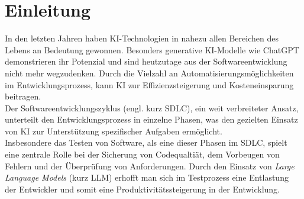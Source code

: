
\chapter{Einleitung}
In den letzten Jahren haben \acs{KI}-Technologien in nahezu allen Bereichen des Lebens an Bedeutung gewonnen. Besonders generative KI-Modelle wie ChatGPT demonstrieren ihr Potenzial und sind heutzutage aus der Softwareentwicklung nicht mehr wegzudenken. \cite{hammermann_ki_nodate} Durch die Vielzahl an Automatisierungsmöglichkeiten im Entwicklungsprozess, kann KI zur Effizienzsteigerung und Kosteneinsparung beitragen.\\ Der Softwareentwicklungszyklus (engl. kurz \acs{SDLC}), ein weit verbreiteter Ansatz, unterteilt den Entwicklungsprozess in einzelne Phasen, was den gezielten Einsatz von KI zur Unterstützung spezifischer Aufgaben ermöglicht.\\ Insbesondere das Testen von Software, als eine dieser Phasen im SDLC, spielt eine zentrale Rolle bei der Sicherung von Codequaltiät, dem Vorbeugen von Fehlern und der Überprüfung von Anforderungen. \cite{noauthor_was_nodate} Durch den Einsatz von \textit{Large Language Models} (kurz LLM) erhofft man sich im Testprozess eine Entlastung der Entwickler und somit eine Produktivitätssteigerung in der Entwicklung.

